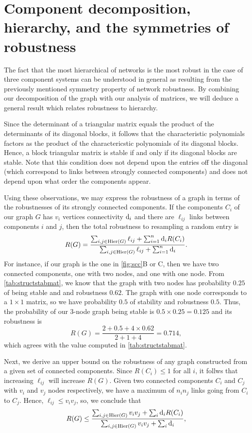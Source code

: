 \section{Component decomposition, hierarchy, and the symmetries of robustness}

The fact that the most hierarchical of networks is the most robust in the case of three component systems can be understood in general as resulting from the previously mentioned symmetry property of network robustness.  By combining our decomposition of the graph with our analysis of matrices, we will deduce a general result which relates robustness to hierarchy.

Since the determinant of a triangular matrix equals the product of the determinants of its diagonal blocks, it follows that the characteristic polynomials factors as the product of the charactericstic polynomials of its diagonal blocks.  Hence, a block triangular matrix is stable if and only if its diagonal blocks are stable.  Note that this condition does not depend upon the entries off the diagonal (which correspond to links between strongly connected components) and does not depend upon what order the components appear.

Using these observations, we may express the robustness of a graph in terms of the robustnesses of its strongly connected components.
If the components $C_i$ of our graph $G$ has $v_i$ vertices connectivity $\mathrm{d}_i$ and there are $\ell_{ij}$ links between components $i$ and $j$, then the total robustness to resampling a random entry is
\begin{align}\label{eq:sccrobustness}
R(G) = \frac{\sum_{i,j \in \mathrm{Hier}(G)} \ell_{ij} + \sum_{i=1}^n \mathrm{d}_i R(C_i)}{\sum_{i,j \in \mathrm{Hier}(G)} \ell_{ij} + \sum_{i=1}^n \mathrm{d}_i}.
\end{align}
For instance, if our graph is the one in \ref{fig:scc}B or C, then we have two connected components, one with two nodes, and one with one node.  From \ref{tab:structstabmat}, we know that the graph with two nodes has probability $0.25$ of being stable and and robustness $0.62$.  The graph with one node corresponds to a $1 \times 1$ matrix, so we have probability $0.5$ of stability and robustness $0.5$.  Thus, the probability of our 3-node graph being stable is $0.5 \times 0.25 = 0.125$ and its robustness is
\[
R(G) = \frac{2 + 0.5 + 4 \times 0.62}{2 + 1 + 4} = 0.714,
\]
which agrees with the value computed in \ref{tab:structstabmat}.

Next, we derive an upper bound on the robustness of any graph constructed from a given set of connected components.  Since $R(C_i) \le 1$ for all $i$, it follws that increasing $\ell_{ij}$ will increase $R(G)$.  Given two connected components $C_i$ and $C_j$ with $v_i$ and $v_j$ nodes respectively, we have a maximum of $n_i n_j$ links going from $C_i$ to $C_j$.  Hence, $\ell_{ij} \le v_i v_j$, so, we conclude that
\begin{align}
R(G) \le \frac{\sum_{i,j \in \mathrm{Hier}(G)} v_i v_j + \sum_i \mathrm{d}_i R(C_i)}
{\sum_{i,j \in \mathrm{Hier}(G)} v_i v_j + \sum_i \mathrm{d}_i}, \label{eq:sccmaxrobustness}
\end{align}

